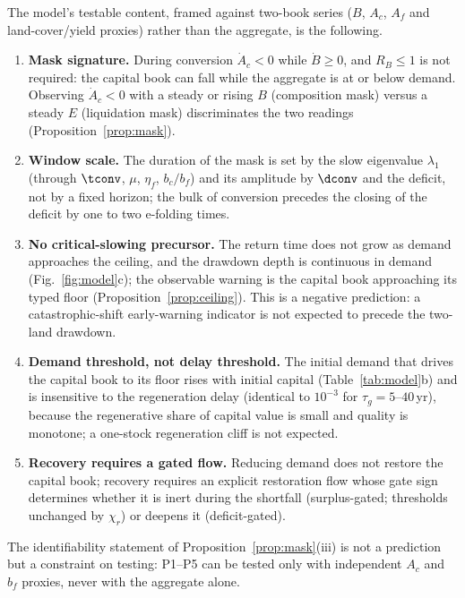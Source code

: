 The model's testable content, framed against two-book series ($B$, $A_c$, $A_f$ and land-cover/yield proxies) rather than the aggregate, is the following.
\begin{enumerate}[label=P\arabic*.,leftmargin=2.2em]
\item \textbf{Mask signature.} During conversion $\dot A_c<0$ while $\dot B\ge0$, and $R_B\le1$ is not required: the capital book can fall while the aggregate is at or below demand. Observing $\dot A_c<0$ with a steady or rising $B$ (composition mask) versus a steady $E$ (liquidation mask) discriminates the two readings (Proposition~\ref{prop:mask}).
\item \textbf{Window scale.} The duration of the mask is set by the slow eigenvalue $\lambda_1$ (through $\tconv$, $\mu$, $\eta_f$, $b_c/b_f$) and its amplitude by $\dconv$ and the deficit, not by a fixed horizon; the bulk of conversion precedes the closing of the deficit by one to two e-folding times.
\item \textbf{No critical-slowing precursor.} The return time does not grow as demand approaches the ceiling, and the drawdown depth is continuous in demand (Fig.~\ref{fig:model}c); the observable warning is the capital book approaching its typed floor (Proposition~\ref{prop:ceiling}). This is a negative prediction: a catastrophic-shift early-warning indicator is not expected to precede the two-land drawdown.
\item \textbf{Demand threshold, not delay threshold.} The initial demand that drives the capital book to its floor rises with initial capital (Table~\ref{tab:model}b) and is insensitive to the regeneration delay (identical to $10^{-3}$ for $\tau_g=5$--$40$\,yr), because the regenerative share of capital value is small and quality is monotone; a one-stock regeneration cliff is not expected.
\item \textbf{Recovery requires a gated flow.} Reducing demand does not restore the capital book; recovery requires an explicit restoration flow whose gate sign determines whether it is inert during the shortfall (surplus-gated; thresholds unchanged by $\chi_r$) or deepens it (deficit-gated).
\end{enumerate}
The identifiability statement of Proposition~\ref{prop:mask}(iii) is not a prediction but a constraint on testing: P1--P5 can be tested only with independent $A_c$ and $b_f$ proxies, never with the aggregate alone.

